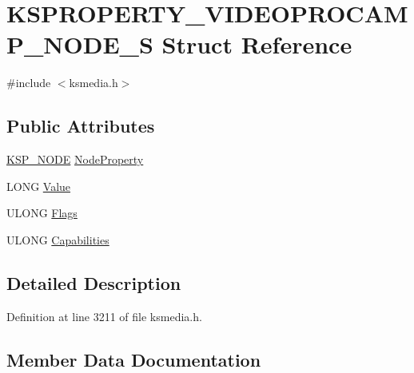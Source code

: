 \hypertarget{struct_k_s_p_r_o_p_e_r_t_y___v_i_d_e_o_p_r_o_c_a_m_p___n_o_d_e___s}{}\section{K\+S\+P\+R\+O\+P\+E\+R\+T\+Y\+\_\+\+V\+I\+D\+E\+O\+P\+R\+O\+C\+A\+M\+P\+\_\+\+N\+O\+D\+E\+\_\+S Struct Reference}
\label{struct_k_s_p_r_o_p_e_r_t_y___v_i_d_e_o_p_r_o_c_a_m_p___n_o_d_e___s}


{\ttfamily \#include $<$ksmedia.\+h$>$}

\subsection*{Public Attributes}
\begin{DoxyCompactItemize}
\item 
\hyperlink{struct_k_s_p___n_o_d_e}{K\+S\+P\+\_\+\+N\+O\+DE} \hyperlink{struct_k_s_p_r_o_p_e_r_t_y___v_i_d_e_o_p_r_o_c_a_m_p___n_o_d_e___s_aee5449e2ec70a040055fdb85e0d7b4ca}{Node\+Property}
\item 
L\+O\+NG \hyperlink{struct_k_s_p_r_o_p_e_r_t_y___v_i_d_e_o_p_r_o_c_a_m_p___n_o_d_e___s_aa549c657a4d4c87abfab570f3e94f953}{Value}
\item 
U\+L\+O\+NG \hyperlink{struct_k_s_p_r_o_p_e_r_t_y___v_i_d_e_o_p_r_o_c_a_m_p___n_o_d_e___s_af885ca9e28cdffa2599b838c3e5421a2}{Flags}
\item 
U\+L\+O\+NG \hyperlink{struct_k_s_p_r_o_p_e_r_t_y___v_i_d_e_o_p_r_o_c_a_m_p___n_o_d_e___s_a47d2a6ed2c6bf51eb10a45ef5bab8c63}{Capabilities}
\end{DoxyCompactItemize}


\subsection{Detailed Description}


Definition at line 3211 of file ksmedia.\+h.



\subsection{Member Data Documentation}
